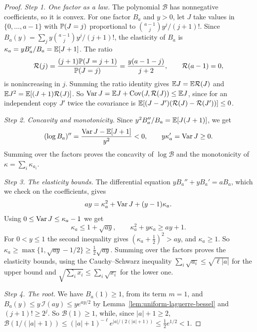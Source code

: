 \begin{proof}
\emph{Step 1. One factor as a law.} The polynomial $\mathcal B$ has
nonnegative coefficients, so it is convex. For one factor $B_a$ and $y>0$, let
$J$ take values in $\{0,\ldots,a-1\}$ with $\mathbb{P}(J=j)$ proportional to
$\binom{a-1}{j}y^j/(j+1)!$. Since $B_a(y)=\sum_jy\binom{a-1}jy^j/(j+1)!$, the elasticity of
$B_a$ is $\kappa_a=yB_a'/B_a=\mathbb{E}[J+1]$. The ratio
\[
\mathcal R(j)=\frac{(j+1)\mathbb{P}(J=j+1)}{\mathbb{P}(J=j)}=\frac{y(a-1-j)}{j+2},
\qquad \mathcal R(a-1)=0,
\]
is nonincreasing in $j$. Summing the ratio identity gives
$\mathbb{E} J=\mathbb{E} \mathcal R(J)$ and $\mathbb{E} J^2=\mathbb{E}[(J+1)\mathcal R(J)]$. So
$\operatorname{Var} J=\mathbb{E} J+\operatorname{Cov}(J,\mathcal R(J))\le \mathbb{E} J$, since for an independent copy $J'$ twice the
covariance is $\mathbb{E}[(J-J')(\mathcal R(J)-\mathcal R(J'))]\le0$.

\emph{Step 2. Concavity and monotonicity.} Since
$y^2B_a''/B_a=\mathbb{E}[J(J+1)]$, we get
\[
 (\log B_a)''=\frac{\operatorname{Var} J-\mathbb{E}[J+1]}{y^2}<0,
 \qquad y\kappa_a'=\operatorname{Var} J\ge0.
\]
Summing over the factors proves the concavity of $\log\mathcal B$ and the monotonicity
of $\kappa=\sum_i\kappa_{a_i}$.

\emph{Step 3. The elasticity bounds.} The differential equation
$yB_a''+yB_a'=aB_a$, which we check on the coefficients, gives
\[
 ay=\kappa_a^2+\operatorname{Var} J+(y-1)\kappa_a.
\]
Using $0\le\operatorname{Var} J\le\kappa_a-1$ we get
\[
 \kappa_a\le1+\sqrt{ay},\qquad \kappa_a^2+y\kappa_a\ge ay+1.
\]
For $0<y\le1$ the second inequality gives $(\kappa_a+\frac12)^2>ay$, and
$\kappa_a\ge1$. So $\kappa_a\ge\max\{1,\sqrt{ay}-1/2\}\ge\tfrac12\sqrt{ay}$.
Summing over the factors proves the elasticity bounds, using the
Cauchy--Schwarz inequality $\sum_i\sqrt{a_i}\le\sqrt{\ell|a|}$ for the upper bound and
$\sqrt{\sum_ix_i}\le\sum_i\sqrt{x_i}$ for the lower one.

\emph{Step 4. The root.} We have $B_a(1)\ge1$, from its term $m=1$, and
$B_a(y)\le y\,\mathcal I(ay)\le y e^{ay/2}$ by Lemma~\ref{lem:uniform-laguerre-bessel} and
$(j+1)!\ge2^j$. So $\mathcal B(1)\ge1$, while, since $|a|+1\ge2$,
$\mathcal B(1/(|a|+1))\le(|a|+1)^{-\ell}e^{|a|/(2(|a|+1))}\le\frac12e^{1/2}<1$.
\end{proof}

